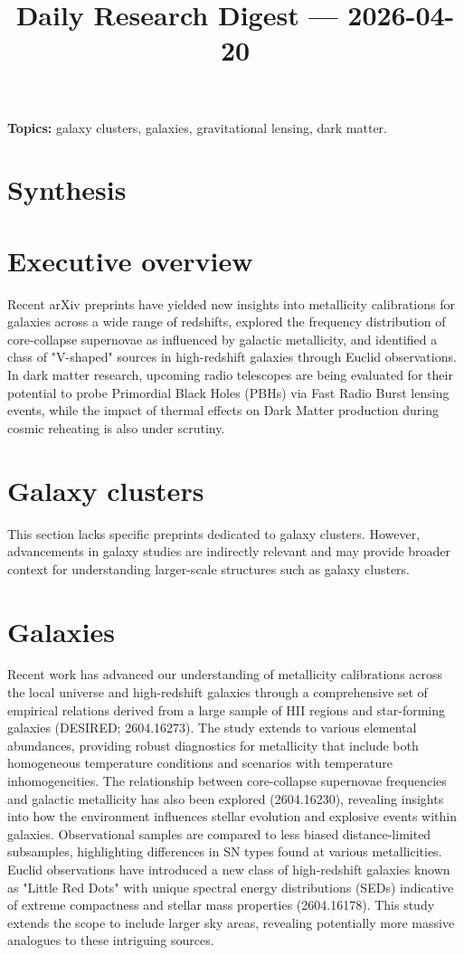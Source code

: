 \documentclass[11pt]{article}
\begin{document}
\title{Daily Research Digest --- 2026-04-20}
\author{}
\date{}
\maketitle
\textbf{Topics:} galaxy clusters, galaxies, gravitational lensing, dark matter.
\section*{Synthesis}
\section*{Executive overview}
Recent arXiv preprints have yielded new insights into metallicity calibrations for galaxies across a wide range of redshifts, explored the frequency distribution of core-collapse supernovae as influenced by galactic metallicity, and identified a class of "V-shaped" sources in high-redshift galaxies through Euclid observations. In dark matter research, upcoming radio telescopes are being evaluated for their potential to probe Primordial Black Holes (PBHs) via Fast Radio Burst lensing events, while the impact of thermal effects on Dark Matter production during cosmic reheating is also under scrutiny.
\section*{Galaxy clusters}
This section lacks specific preprints dedicated to galaxy clusters. However, advancements in galaxy studies are indirectly relevant and may provide broader context for understanding larger-scale structures such as galaxy clusters.
\section*{Galaxies}
Recent work has advanced our understanding of metallicity calibrations across the local universe and high-redshift galaxies through a comprehensive set of empirical relations derived from a large sample of HII regions and star-forming galaxies (DESIRED; 2604.16273). The study extends to various elemental abundances, providing robust diagnostics for metallicity that include both homogeneous temperature conditions and scenarios with temperature inhomogeneities.
The relationship between core-collapse supernovae frequencies and galactic metallicity has also been explored (2604.16230), revealing insights into how the environment influences stellar evolution and explosive events within galaxies. Observational samples are compared to less biased distance-limited subsamples, highlighting differences in SN types found at various metallicities.
Euclid observations have introduced a new class of high-redshift galaxies known as "Little Red Dots" with unique spectral energy distributions (SEDs) indicative of extreme compactness and stellar mass properties (2604.16178). This study extends the scope to include larger sky areas, revealing potentially more massive analogues to these intriguing sources.
\end{document}

